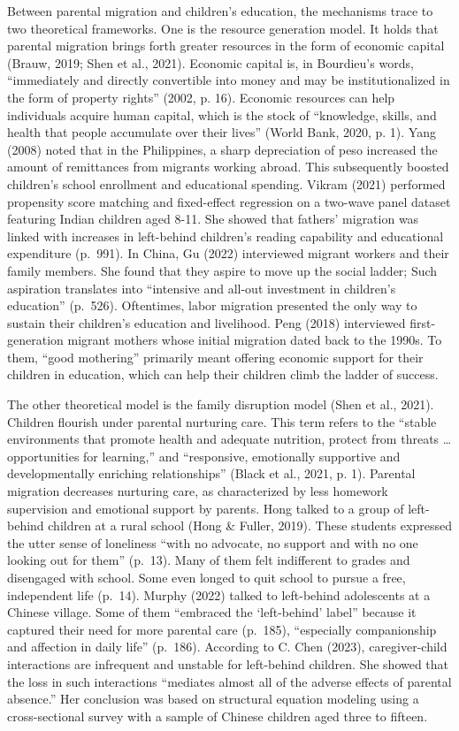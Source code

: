 \documentclass[
  man,floatsintext]{apa7}
\begin{document}
Between parental migration and children's education, the mechanisms trace to two theoretical frameworks. One is the resource generation model. It holds that parental migration brings forth greater resources in the form of economic capital (Brauw, 2019; Shen et al., 2021). Economic capital is, in Bourdieu's words, ``immediately and directly convertible into money and may be institutionalized in the form of property rights'' (2002, p. 16). Economic resources can help individuals acquire human capital, which is the stock of ``knowledge, skills, and health that people accumulate over their lives'' (World Bank, 2020, p. 1). Yang (2008) noted that in the Philippines, a sharp depreciation of peso increased the amount of remittances from migrants working abroad. This subsequently boosted children's school enrollment and educational spending. Vikram (2021) performed propensity score matching and fixed-effect regression on a two-wave panel dataset featuring Indian children aged 8-11. She showed that fathers' migration was linked with increases in left-behind children's reading capability and educational expenditure (p.~991). In China, Gu (2022) interviewed migrant workers and their family members. She found that they aspire to move up the social ladder; Such aspiration translates into ``intensive and all-out investment in children's education'' (p.~526). Oftentimes, labor migration presented the only way to sustain their children's education and livelihood. Peng (2018) interviewed first-generation migrant mothers whose initial migration dated back to the 1990s. To them, ``good mothering'' primarily meant offering economic support for their children in education, which can help their children climb the ladder of success.

The other theoretical model is the family disruption model (Shen et al., 2021). Children flourish under parental nurturing care. This term refers to the ``stable environments that promote health and adequate nutrition, protect from threats \ldots{} opportunities for learning,'' and ``responsive, emotionally supportive and developmentally enriching relationships'' (Black et al., 2021, p. 1). Parental migration decreases nurturing care, as characterized by less homework supervision and emotional support by parents. Hong talked to a group of left-behind children at a rural school (Hong \& Fuller, 2019). These students expressed the utter sense of loneliness ``with no advocate, no support and with no one looking out for them'' (p.~13). Many of them felt indifferent to grades and disengaged with school. Some even longed to quit school to pursue a free, independent life (p.~14). Murphy (2022) talked to left-behind adolescents at a Chinese village. Some of them ``embraced the `left-behind' label'' because it captured their need for more parental care (p.~185), ``especially companionship and affection in daily life'' (p.~186). According to C. Chen (2023), caregiver-child interactions are infrequent and unstable for left-behind children. She showed that the loss in such interactions ``mediates almost all of the adverse effects of parental absence.'' Her conclusion was based on structural equation modeling using a cross-sectional survey with a sample of Chinese children aged three to fifteen.
\end{document}
